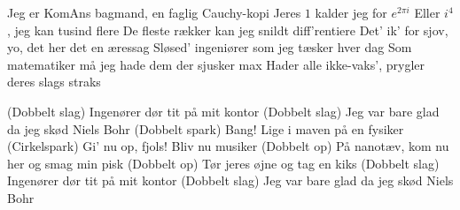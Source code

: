 \documentclass[a4paper,11pt]{article}
\begin{document}
\begin{song}
 Jeg er KomAns bagmand, en faglig Cauchy-kopi
Jeres $1$ kalder jeg for $e^{2\pi i}$
Eller $i^4$, jeg kan tusind flere
De fleste rækker kan jeg snildt diff'rentiere
Det' ik' for sjov, yo, det her det en æressag
Sløsed' ingeniører som jeg tæsker hver dag
Som matematiker må jeg hade dem der sjusker max
Hader alle ikke-vaks', prygler deres slags straks

 (Dobbelt slag) Ingenører dør tit på mit kontor
(Dobbelt slag) Jeg var bare glad da jeg skød Niels Bohr
(Dobbelt spark) Bang! Lige i maven på en fysiker
(Cirkelspark) Gi' nu op, fjols! Bliv nu musiker
(Dobbelt op) På nanotæv, kom nu her og smag min pisk
(Dobbelt op) Tør jeres øjne og tag en kiks
(Dobbelt slag) Ingenører dør tit på mit kontor
(Dobbelt slag) Jeg var bare glad da jeg skød Niels Bohr
\end{song}
\end{document}
